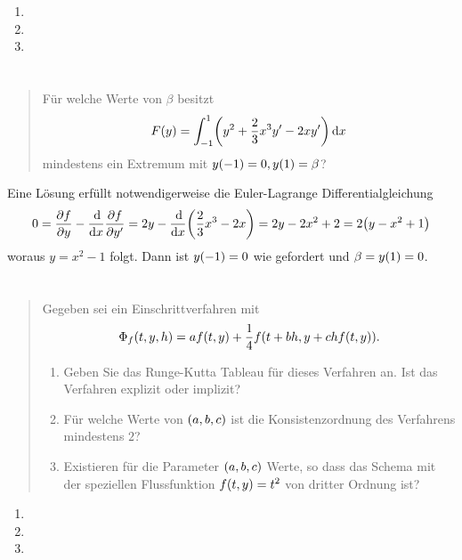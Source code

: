 \documentclass{exercise}
\begin{document}
	\begin{enumerate}
		\item
		\item
		\item
	\end{enumerate}


	\section{}

	\begin{quote}
		Für welche Werte von \(\beta\) besitzt
		\[
			F\parentheses*{y} = \int_{-1}^1 \parentheses*{y^2 + \frac{2}{3}x^3 y' - 2xy'}\d x
		\]
		mindestens ein Extremum mit \(y\parentheses*{-1} = 0, y\parentheses*{1} = \beta\)?
	\end{quote}

	Eine Lösung erfüllt notwendigerweise die Euler-Lagrange Differentialgleichung
	\[
		0 = \frac{\partial f}{\partial y} - \frac{\d}{\d x}\frac{\partial f}{\partial y'} = 2y - \frac{\d}{\d x}\parentheses*{\frac{2}{3}x^3 - 2x} = 2y - 2x^2 + 2 = 2\parentheses*{y - x^2 + 1}
	\]
	woraus \(y = x^2 - 1\) folgt.
	Dann ist \(y\parentheses*{-1} = 0\) wie gefordert und \(\beta = y\parentheses*{1} = 0\).


	\section{}

	\begin{quote}
		Gegeben sei ein Einschrittverfahren mit
		\[
			\Phi_f\parentheses*{t, y, h} = af\parentheses*{t, y} + \frac{1}{4}f\parentheses*{t + bh, y + chf\parentheses*{t, y}}.
		\]
		\begin{enumerate}
			\item Geben Sie das Runge-Kutta Tableau für dieses Verfahren an.
			Ist das Verfahren explizit oder implizit?
			\item Für welche Werte von \(\parentheses*{a, b, c}\) ist die Konsistenzordnung des Verfahrens mindestens \(2\)?
			\item Existieren für die Parameter \(\parentheses*{a, b, c}\) Werte, so dass das Schema mit der speziellen Flussfunktion \(f\parentheses*{t, y} = t^2\) von dritter Ordnung ist?
		\end{enumerate}
	\end{quote}

	\begin{enumerate}
		\item
		\item
		\item
	\end{enumerate}
\end{document}
